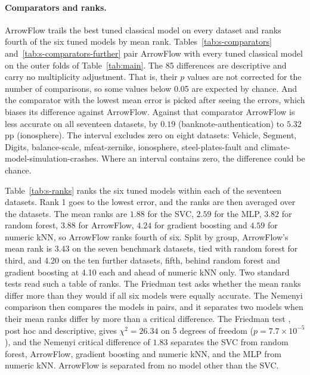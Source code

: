 \paragraph{Comparators and ranks.} ArrowFlow trails the best tuned classical model on every dataset and ranks fourth of the six tuned models by mean rank. Tables~\ref{tab:s-comparators} and~\ref{tab:s-comparators-further} pair ArrowFlow with every tuned classical model on the outer folds of Table~\ref{tab:main}. The 85 differences are descriptive and carry no multiplicity adjustment. That is, their $p$ values are not corrected for the number of comparisons, so some values below 0.05 are expected by chance. And the comparator with the lowest mean error is picked after seeing the errors, which biases its difference against ArrowFlow. Against that comparator ArrowFlow is less accurate on all seventeen datasets, by $0.19$ (banknote-authentication) to $5.32$ pp (ionosphere). The interval excludes zero on eight datasets: Vehicle, Segment, Digits, balance-scale, mfeat-zernike, ionosphere, steel-plates-fault and climate-model-simulation-crashes. Where an interval contains zero, the difference could be chance.

Table~\ref{tab:s-ranks} ranks the six tuned models within each of the seventeen datasets. Rank 1 goes to the lowest error, and the ranks are then averaged over the datasets. The mean ranks are $1.88$ for the SVC, $2.59$ for the MLP, $3.82$ for random forest, $3.88$ for ArrowFlow, $4.24$ for gradient boosting and $4.59$ for numeric kNN, so ArrowFlow ranks fourth of six. Split by group, ArrowFlow's mean rank is 3.43 on the seven benchmark datasets, tied with random forest for third, and 4.20 on the ten further datasets, fifth, behind random forest and gradient boosting at 4.10 each and ahead of numeric kNN only. Two standard tests read such a table of ranks. The Friedman test asks whether the mean ranks differ more than they would if all six models were equally accurate. The Nemenyi comparison then compares the models in pairs, and it separates two models when their mean ranks differ by more than a critical difference. The Friedman test \citep{demsar2006statistical}, post hoc and descriptive, gives $\chi^2=26.34$ on 5 degrees of freedom ($p=7.7\times10^{-5}$), and the Nemenyi critical difference of $1.83$ separates the SVC from random forest, ArrowFlow, gradient boosting and numeric kNN, and the MLP from numeric kNN. ArrowFlow is separated from no model other than the SVC.





